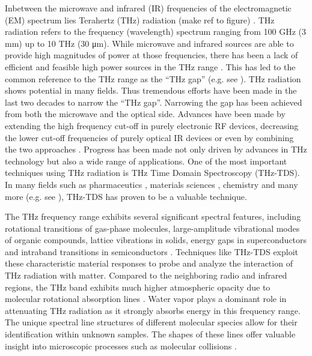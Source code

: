 Inbetween the microwave and infrared (IR) frequencies of the electromagnetic (EM) spectrum lies Terahertz (THz) radiation (make ref to figure) \cite{zhangIntroductionTHzWave2010}. THz radiation refers to the frequency (wavelength) spectrum ranging from \num{100} \si{\giga\hertz} (\num{3} \si{\milli\meter}) up to \num{10} \si{\tera\hertz} (\num{30} \si{\micro\meter}). While microwave and infrared sources are able to provide high magnitudes of power at those frequencies, there has been a lack of efficient and feasible high power sources in the THz range \cite{perkowitzNavigatingTerahertzGap2020}. This has led to the common reference to the THz range as the \enquote{THz gap} (e.g. see \cite{dhillon2017TerahertzScience2017, williamsFillingTHzGap2006, zhangAdvancesTerahertzTechnology2021}). THz radiation shows potential in many fields. Thus tremendous efforts have been made in the last two decades to narrow the \enquote{THz gap}. Narrowing the gap has been achieved from both the microwave and the optical side. Advances have been made by extending the high frequency cut-off in purely electronic RF devices, decreasing the lower cut-off frequencies of purely optical IR devices or even by combining the two approaches \cite{preuTunableContinuouswaveTerahertz2011}. Progress has been made not only driven by advances in THz technology but also a wide range of applications. One of the most important techniques using THz radiation is THz Time Domain Spectroscopy (THz-TDS). In many fields such as pharmaceutics \cite{huangProgressApplicationTerahertz2023}, materials sciences \cite{zhangApplicationTHzTDSCharacterization2024}, chemistry \cite{fischerChemicalRecognitionTerahertz2005} and many more (e.g. see \cite{petrovMobileNearfieldTerahertz2023, markelzPerspectiveTerahertzApplications2022,TerahertzSpectroscopyIts2011,kleine-ostmannReviewTerahertzCommunications2011}), THz-TDS has proven to be a valuable technique.

The THz frequency range exhibits several significant spectral features, including rotational transitions of gas-phase molecules, large-amplitude vibrational modes of organic compounds, lattice vibrations in solids, energy gaps in superconductors and intraband transitions in semiconductors \cite{PrinciplesTerahertzScience2009}. Techniques like THz-TDS exploit these characteristic material responses to probe and analyze the interaction of THz radiation with matter. Compared to the neighboring radio and infrared regions, the THz band exhibits much higher atmospheric opacity due to molecular rotational absorption lines \cite{fedorovPowerfulTerahertzWaves2020}. Water vapor plays a dominant role in attenuating THz radiation as it strongly absorbs energy in this frequency range. The unique spectral line structures of different molecular species allow for their identification within unknown samples. The shapes of these lines offer valuable insight into microscopic processes such as molecular collisions \cite{PrinciplesTerahertzScience2009}.

